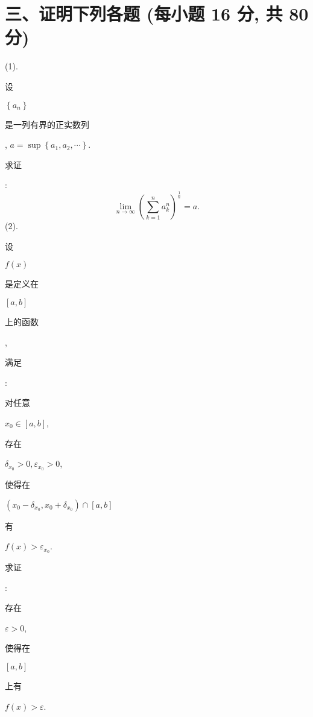 \documentclass[10pt]{article}
\begin{document}
\section{三、证明下列各题 (每小题 16 分, 共 80 分)}
(1). \begin{CJK}{UTF8}{mj}设\end{CJK} $\left\{a_{n}\right\}$ \begin{CJK}{UTF8}{mj}是一列有界的正实数列\end{CJK}, $a=\sup \left\{a_{1}, a_{2}, \cdots\right\}$. \begin{CJK}{UTF8}{mj}求证\end{CJK}:
$$
\lim _{n \rightarrow \infty}\left(\sum_{k=1}^{n} a_{k}^{n}\right)^{\frac{1}{n}}=a .
$$
(2). \begin{CJK}{UTF8}{mj}设\end{CJK} $f(x)$ \begin{CJK}{UTF8}{mj}是定义在\end{CJK} $[a, b]$ \begin{CJK}{UTF8}{mj}上的函数\end{CJK}, \begin{CJK}{UTF8}{mj}满足\end{CJK}: \begin{CJK}{UTF8}{mj}对任意\end{CJK} $x_{0} \in[a, b]$, \begin{CJK}{UTF8}{mj}存在\end{CJK} $\delta_{x_{0}}>0, \varepsilon_{x_{0}}>0$, \begin{CJK}{UTF8}{mj}使得在\end{CJK} $\left(x_{0}-\delta_{x_{0}}, x_{0}+\delta_{x_{0}}\right) \cap[a, b]$ \begin{CJK}{UTF8}{mj}有\end{CJK} $f(x)>\varepsilon_{x_{0}}$. \begin{CJK}{UTF8}{mj}求证\end{CJK}: \begin{CJK}{UTF8}{mj}存在\end{CJK} $\varepsilon>0$, \begin{CJK}{UTF8}{mj}使得在\end{CJK} $[a, b]$ \begin{CJK}{UTF8}{mj}上有\end{CJK} $f(x)>\varepsilon$.
\end{document}
